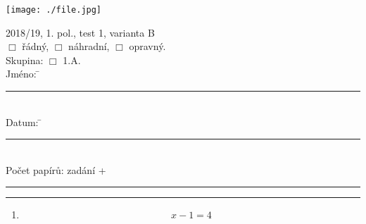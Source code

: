 \documentclass[czech, a4paper, 12pt]{exam}
\begin{document}
\begin{minipage}{9cm}
    \texttt{[image: ./file.jpg]}
\end{minipage}
\begin{minipage}{5cm}
\begin{tabbing}
2018/19, 1. pol., test 1, varianta B\\[.1cm]
$\Box$ řádný, \hspace{.2cm} $\Box$ náhradní, \hspace{.2cm} $\Box$ opravný. \\[.1cm]
Skupina:
    $\Box$ 1.A. \\[.1cm]
Jméno: \hspace{2cm} \= \rule{4.7cm}{.1mm} \\[.1cm]
Datum: \hspace{2cm} \= \rule{4.7cm}{.1mm} \\[.1cm]
Počet papírů:\> zadání + \rule{1.2cm}{.1mm}
\end{tabbing}
\end{minipage}

\vspace{.3cm}
\begin{center}
\rule{17cm}{.7mm}
\end{center}
\vspace{.3cm}



\begin{enumerate}


    \item
    $$ x - 1 = 4 $$




\end{enumerate}
\end{document}
